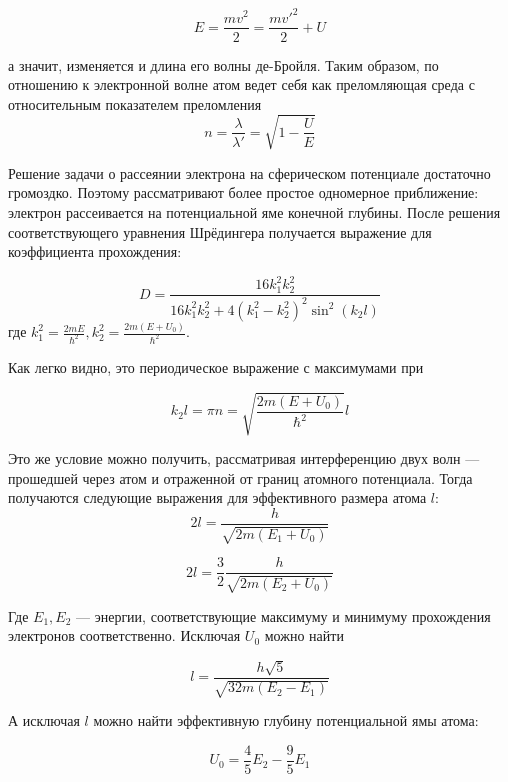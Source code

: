 \documentclass[a4paper, 12pt]{article}
\begin{document}
\[E = \frac{mv^2}{2} = \frac{mv'^2}{2}+U\]

а значит, изменяется и длина его волны де-Бройля. Таким образом, по отношению к электронной волне атом ведет себя как преломляющая среда с относительным показателем преломления
\begin{equation}
n = \frac{\lambda}{\lambda'} = \sqrt{1 - \frac{U}{E}}
\end{equation}

Решение задачи о рассеянии электрона на сферическом потенциале достаточно громоздко. Поэтому рассматривают более простое одномерное приближение: электрон рассеивается на потенциальной яме конечной глубины. После решения соответствующего уравнения Шрёдингера получается выражение для коэффициента прохождения:

\begin{equation}
D = \frac{16 k_1^2 k_2^2}{16k_1^2 k_2^2 + 4\left(k_1^2-k_2^2\right)^2\sin^2\left(k_2 l\right)}
\end{equation}
где $k_1^2 = \frac{2mE}{\hbar^2}, k_2^2 = \frac{2m(E + U_0)}{\hbar^2}$.

Как легко видно, это периодическое выражение с максимумами при 

\begin{equation}
k_2 l = \pi n = \sqrt{\frac{2m(E + U_0)}{\hbar^2}}l
\end{equation}

Это же условие можно получить, рассматривая интерференцию двух волн --- прошедшей через атом и отраженной от границ атомного потенциала. Тогда получаются следующие выражения для эффективного размера атома $l$:
\begin{equation}
2l = \frac{h}{\sqrt{2m(E_1 + U_0)}}
\end{equation}

\begin{equation}
2l = \frac{3}{2}\frac{h}{\sqrt{2m(E_2 + U_0)}}
\end{equation}

Где $E_1, E_2$ --- энергии, соответствующие максимуму и минимуму прохождения электронов соответственно. Исключая $U_0$ можно найти 

\begin{equation}
l = \frac{h\sqrt{5}}{\sqrt{32m(E_2 - E_1)}}
\end{equation}


А исключая $l$ можно найти эффективную глубину потенциальной ямы атома:

\begin{equation}
U_0 = \frac{4}{5}E_2 - \frac{9}{5}E_1
\end{equation}
\end{document}
